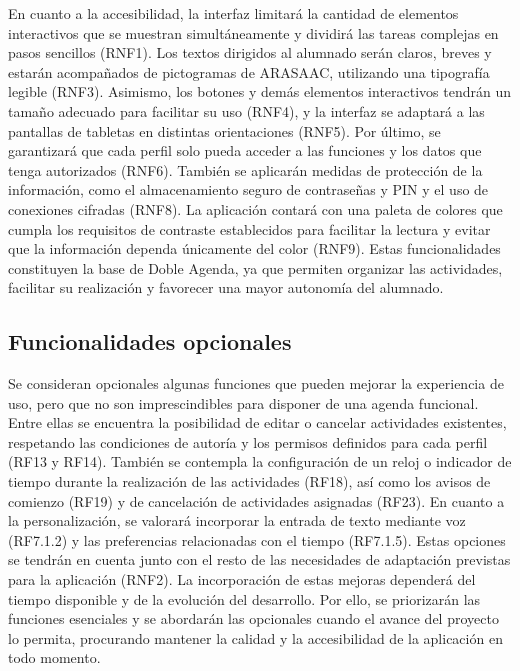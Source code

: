En cuanto a la accesibilidad, la interfaz limitará la cantidad de elementos interactivos que se muestran simultáneamente y dividirá las tareas complejas en pasos sencillos (RNF1). Los textos dirigidos al alumnado serán claros, breves y estarán acompañados de pictogramas de ARASAAC, utilizando una tipografía legible (RNF3). Asimismo, los botones y demás elementos interactivos tendrán un tamaño adecuado para facilitar su uso (RNF4), y la interfaz se adaptará a las pantallas de tabletas en distintas orientaciones (RNF5).
Por último, se garantizará que cada perfil solo pueda acceder a las funciones y los datos que tenga autorizados (RNF6). También se aplicarán medidas de protección de la información, como el almacenamiento seguro de contraseñas y PIN y el uso de conexiones cifradas (RNF8). La aplicación contará con una paleta de colores que cumpla los requisitos de contraste establecidos para facilitar la lectura y evitar que la información dependa únicamente del color (RNF9).
Estas funcionalidades constituyen la base de Doble Agenda, ya que permiten organizar las actividades, facilitar su realización y favorecer una mayor autonomía del alumnado.

\subsection{Funcionalidades opcionales}
Se consideran opcionales algunas funciones que pueden mejorar la experiencia de uso, pero que no son imprescindibles para disponer de una agenda funcional.
Entre ellas se encuentra la posibilidad de editar o cancelar actividades existentes, respetando las condiciones de autoría y los permisos definidos para cada perfil (RF13 y RF14). También se contempla la configuración de un reloj o indicador de tiempo durante la realización de las actividades (RF18), así como los avisos de comienzo (RF19) y de cancelación de actividades asignadas (RF23).
En cuanto a la personalización, se valorará incorporar la entrada de texto mediante voz (RF7.1.2) y las preferencias relacionadas con el tiempo (RF7.1.5). Estas opciones se tendrán en cuenta junto con el resto de las necesidades de adaptación previstas para la aplicación (RNF2).
La incorporación de estas mejoras dependerá del tiempo disponible y de la evolución del desarrollo. Por ello, se priorizarán las funciones esenciales y se abordarán las opcionales cuando el avance del proyecto lo permita, procurando mantener la calidad y la accesibilidad de la aplicación en todo momento.

